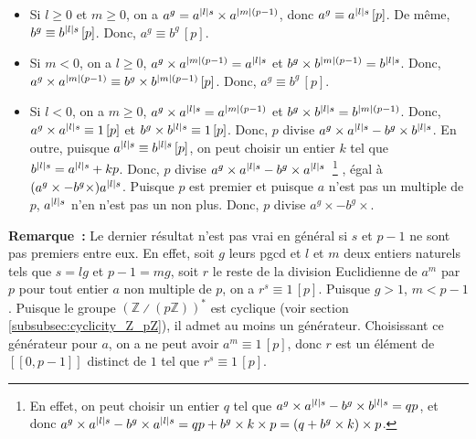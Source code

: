\begin{itemize}[nosep]
    \item Si $l \geq 0$ et $m \geq 0$, on a $a^g = a^{\left\lvert l \right\rvert s} \times a^{\left\lvert m \right\rvert (p-1)}$, donc $a^g \equiv a^{\left\lvert l \right\rvert s} \, [p]$.
        De même, $b^g \equiv b^{\left\lvert l \right\rvert s} \, [p]$.
        Donc, $a^g \equiv b^g \, [p]$.
    \item Si $m < 0$, on a $l \geq 0$, $a^g \times a^{\left\lvert m \right\rvert (p-1)} = a^{\left\lvert l \right\rvert s}$ et $b^g \times b^{\left\lvert m \right\rvert (p-1)} = b^{\left\lvert l \right\rvert s}$.
        Donc, $a^g \times a^{\left\lvert m \right\rvert (p-1)} \equiv b^g \times b^{\left\lvert m \right\rvert (p-1)} \, [p]$.
        Donc, $a^g \equiv b^g \, [p]$.
    \item Si $l < 0$, on a $m \geq 0$, $a^g \times a^{\left\lvert l \right\rvert s} = a^{\left\lvert m \right\rvert (p-1)}$ et $b^g \times b^{\left\lvert l \right\rvert s} = b^{\left\lvert m \right\rvert (p-1)}$.
        Donc, $a^g \times a^{\left\lvert l \right\rvert s} \equiv 1 \, [p]$ et $b^g \times b^{\left\lvert l \right\rvert s} \equiv 1 \, [p]$. 
        Donc, $p$ divise $a^g \times a^{\left\lvert l \right\rvert s} - b^g \times b^{\left\lvert l \right\rvert s}$. 
        En outre, puisque $a^{\left\lvert l \right\rvert s} \equiv b^{\left\lvert l \right\rvert s} \, [p]$, on peut choisir un entier $k$ tel que $b^{\left\lvert l \right\rvert s} = a^{\left\lvert l \right\rvert s} + k p$.
        Donc, $p$ divise $a^g \times a^{\left\lvert l \right\rvert s} - b^g \times a^{\left\lvert l \right\rvert s}$~\footnote{
            En effet, on peut choisir un entier $q$ tel que $a^g \times a^{\left\lvert l \right\rvert s} - b^g \times b^{\left\lvert l \right\rvert s} = q p$, et donc $a^g \times a^{\left\lvert l \right\rvert s} - b^g \times a^{\left\lvert l \right\rvert s} = q p + b^g \times k \times p = (q + b^g \times k) \times p$.
        }%
        , égal à $(a^g \times - b^g \times) a^{\left\lvert l \right\rvert s}$. 
        Puisque $p$ est premier et puisque $a$ n'est pas un multiple de $p$, $a^{\left\lvert l \right\rvert s}$ n'en n'est pas un non plus.
        Donc, $p$ divise $a^g \times - b^g \times$.
\end{itemize}

\done

\medskip

\noindent\textbf{Remarque :} Le dernier résultat n'est pas vrai en général si $s$ et $p-1$ ne sont pas premiers entre eux.
    En effet, soit $g$ leurs pgcd et $l$ et $m$ deux entiers naturels tels que $s = l g$ et $p-1 = m g$, soit $r$ le reste de la division Euclidienne de $a^m$ par $p$ pour tout entier $a$ non multiple de $p$, on a $r^s \equiv 1 \, [p]$. 
    Puisque $g > 1$, $m < p-1$. 
    Puisque le groupe $(\mathbb{Z} \divslash (p \mathbb{Z}))^*$ est cyclique (voir section \ref{subsubsec:cyclicity_Z_pZ}), il admet au moins un générateur. 
    Choisissant ce générateur pour $a$, on a ne peut avoir $a^m \equiv 1 \, [p]$, donc $r$ est un élément de $[\![0, p-1]\!]$ distinct de $1$ tel que $r^s \equiv 1 \, [p]$.
